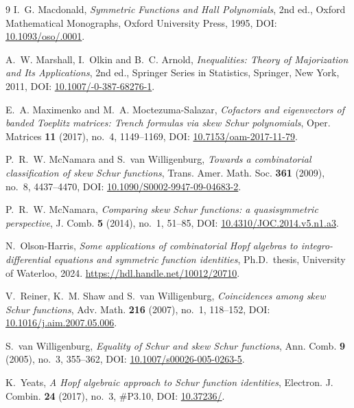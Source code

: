 \documentclass[11pt,a4paper]{amsart}
\numberwithin{equation}{section}
\theoremstyle{plain}
\theoremstyle{definition}
\begin{document}
\begin{thebibliography}{9}
I.~G. Macdonald,
\emph{Symmetric Functions and Hall Polynomials}, 2nd ed.,
Oxford Mathematical Monographs, Oxford University Press, 1995,
DOI: \href{https://doi.org/10.1093/oso/9780198534891.001.0001}{10.1093/\allowbreak oso/.0001}.

A.~W. Marshall, I.~Olkin and B.~C. Arnold,
\emph{Inequalities: Theory of Majorization and Its Applications},
2nd ed., Springer Series in Statistics, Springer, New York, 2011,
DOI: \href{https://doi.org/10.1007/978-0-387-68276-1}{10.1007/-0-387-68276-1}.

E.~A. Maximenko and M.~A. Moctezuma-Salazar,
\emph{Cofactors and eigenvectors of banded Toeplitz matrices: Trench formulas via skew Schur polynomials},
Oper. Matrices \textbf{11} (2017), no.~4, 1149--1169,
DOI: \href{https://doi.org/10.7153/oam-2017-11-79}{10.7153/\allowbreak oam-2017-11-79}.

P.~R.~W. McNamara and S.~van Willigenburg,
\emph{Towards a combinatorial classification of skew Schur functions},
Trans. Amer. Math. Soc. \textbf{361} (2009), no.~8, 4437--4470,
DOI: \href{https://doi.org/10.1090/S0002-9947-09-04683-2}{10.1090/\allowbreak S0002-9947-09-04683-2}.

P.~R.~W. McNamara,
\emph{Comparing skew Schur functions: a quasisymmetric perspective},
J. Comb. \textbf{5} (2014), no.~1, 51--85,
DOI: \href{https://doi.org/10.4310/JOC.2014.v5.n1.a3}{10.4310/\allowbreak JOC.2014.v5.n1.a3}.

N.~Olson-Harris,
\emph{Some applications of combinatorial Hopf algebras to integro-differential equations and symmetric function identities},
Ph.D.\ thesis, University of Waterloo, 2024.
\url{https://hdl.handle.net/10012/20710}.

V.~Reiner, K.~M. Shaw and S.~van Willigenburg,
\emph{Coincidences among skew Schur functions},
Adv. Math. \textbf{216} (2007), no.~1, 118--152,
DOI: \href{https://doi.org/10.1016/j.aim.2007.05.006}{10.1016/\allowbreak j.aim.2007.05.006}.

S.~van Willigenburg,
\emph{Equality of Schur and skew Schur functions},
Ann. Comb. \textbf{9} (2005), no.~3, 355--362,
DOI: \href{https://doi.org/10.1007/s00026-005-0263-5}{10.1007/\allowbreak s00026-005-0263-5}.

K.~Yeats,
\emph{A Hopf algebraic approach to Schur function identities},
Electron. J. Combin. \textbf{24} (2017), no.~3, \#P3.10,
DOI: \href{https://doi.org/10.37236/5741}{10.37236/}.

\end{thebibliography}
\end{document}
